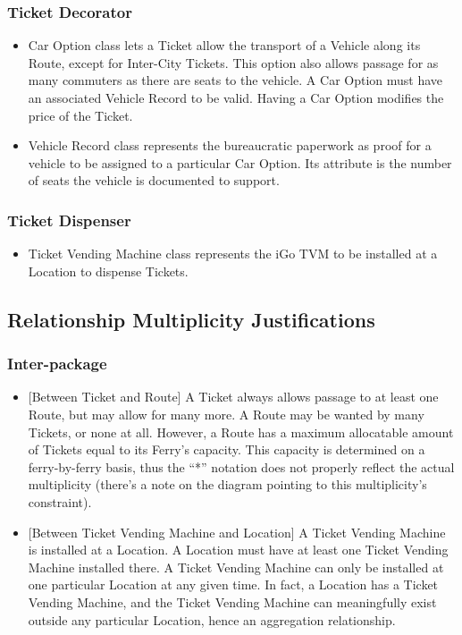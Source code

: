 \documentclass[letterpaper]{report}
\begin{document}
\subsubsection{Ticket Decorator}
\begin{itemize}
    \item Car Option class lets a Ticket allow the transport of a Vehicle along its Route, except for Inter-City Tickets. This option also allows passage for as many commuters as there are seats to the vehicle. A Car Option must have an associated Vehicle Record to be valid. Having a Car Option modifies the price of the Ticket.
    \item Vehicle Record class represents the bureaucratic paperwork as proof for a vehicle to be assigned to a particular Car Option. Its attribute is the number of seats the vehicle is documented to support.
\end{itemize}

\subsubsection{Ticket Dispenser}
\begin{itemize}
    \item Ticket Vending Machine class represents the iGo TVM to be installed at a Location to dispense Tickets.
\end{itemize}

\subsection{Relationship Multiplicity Justifications}
\subsubsection{Inter-package}
\begin{itemize}
    \item {[Between Ticket and Route]} A Ticket always allows passage to at least one Route, but may allow for many more. A Route may be wanted by many Tickets, or none at all. However, a Route has a maximum allocatable amount of Tickets equal to its Ferry’s capacity. This capacity is determined on a ferry-by-ferry basis, thus the “*” notation does not properly reflect the actual multiplicity (there’s a note on the diagram pointing to this multiplicity’s constraint).
    \item {[Between Ticket Vending Machine and Location]} A Ticket Vending Machine is installed at a Location. A Location must have at least one Ticket Vending Machine installed there. A Ticket Vending Machine can only be installed at one particular Location at any given time. In fact, a Location has a Ticket Vending Machine, and the Ticket Vending Machine can meaningfully exist outside any particular Location, hence an aggregation relationship.
\end{itemize}
\end{document}
